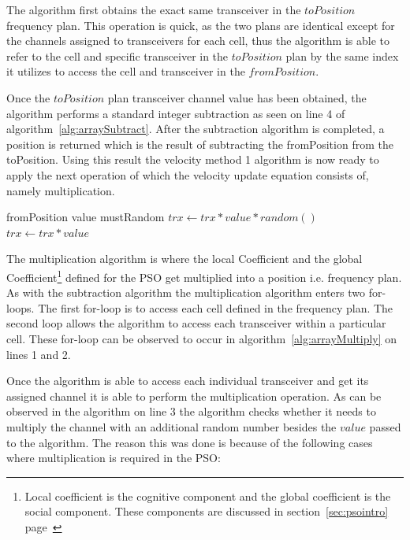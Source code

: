 The algorithm first obtains the exact same transceiver in the $toPosition$ frequency plan. This operation is quick, as the two plans are identical except for the channels assigned to transceivers for each cell, thus the algorithm is able to refer to the cell and specific transceiver in the $toPosition$ plan by the same index it utilizes to access the cell and transceiver in the $fromPosition$.

Once the $toPosition$ plan transceiver channel value has been obtained, the algorithm performs a standard integer subtraction as seen on line 4 of algorithm~\ref{alg:arraySubtract}.
After the subtraction algorithm is completed, a position is returned which is the result of subtracting the fromPosition from the toPosition. Using this result the velocity method 1 algorithm is now ready to apply the next operation of which the velocity update equation consists of, namely multiplication.

\begin{algorithm}
\caption{Multiply position with a value (Method 1)}
\label{alg:arrayMultiply}
\begin{algorithmic}[1]
	\REQUIRE fromPosition
	\REQUIRE value
	\REQUIRE mustRandom
				\STATE $trx \leftarrow trx * value * random()$
			\ELSE
				\STATE $trx \leftarrow trx * value$
			\ENDIF
		\ENDFOR
	\ENDFOR
\end{algorithmic}
\end{algorithm}

The multiplication algorithm is where the local Coefficient and the global Coefficient\footnote{Local coefficient is the cognitive component and the global coefficient is the social component. These components are discussed in section~\ref{sec:psointro} page~\pageref{def:socialcomponent}} defined for the PSO get multiplied into a position i.e. frequency plan. As with the subtraction algorithm the multiplication algorithm enters two for-loops. The first for-loop is to access each cell defined in the frequency plan. The second loop allows the algorithm to access each transceiver within a particular cell. These for-loop can be observed to occur in algorithm~\ref{alg:arrayMultiply} on lines 1 and 2.

Once the algorithm is able to access each individual transceiver and get its assigned channel it is able to perform the multiplication operation. As can be observed in the algorithm on line 3 the algorithm checks whether it needs to multiply the channel with an additional random number besides the $value$ passed to the algorithm. The reason this was done is because of the following cases where multiplication is required in the PSO:

